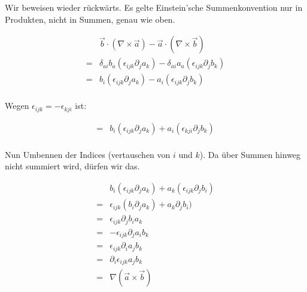 \documentclass[a4paper,german,12pt,smallheadings]{scrartcl}
\begin{document}
Wir beweisen wieder rückwärts. Es gelte Einstein'sche Summenkonvention nur in
Produkten, nicht in Summen, genau wie oben.

\begin{align*}
  &\vec{b} \cdot (\nabla \times \vec{a}) - \vec{a} \cdot (\nabla \times \vec{b})\\
  =&\delta_{ai} b_a (\epsilon_{ijk} \partial_j a_k) - \delta_{ai} a_a (\epsilon_{ijk} \partial_j b_k)\\
  =&b_i (\epsilon_{ijk} \partial_j a_k) - a_i (\epsilon_{ijk} \partial_j b_k)\\
\end{align*}

Wegen $\epsilon_{ijk} = -\epsilon_{kji}$ ist:

\begin{align*}
  =&b_i (\epsilon_{ijk} \partial_j a_k) + a_i (\epsilon_{kji} \partial_j b_k)\\
\end{align*}

Nun Umbennen der Indices (vertauschen von $i$ und $k$). Da über Summen hinweg
nicht summiert wird, dürfen wir das.

\begin{align*}
  &b_i (\epsilon_{ijk} \partial_j a_k) + a_k (\epsilon_{ijk} \partial_j b_i)\\
  =&\epsilon_{ijk} (b_i \partial_j a_k) + a_k \partial_j b_i)\\
  =&\epsilon_{ijk} \partial_j b_i a_k\\
  =&-\epsilon_{ijk} \partial_j a_i b_k\\
  =&\epsilon_{ijk} \partial_i a_j b_k\\
  =&\partial_i \epsilon_{ijk} a_j b_k\\
  =&\nabla (\vec{a} \times \vec{b})
\end{align*}
\end{document}

